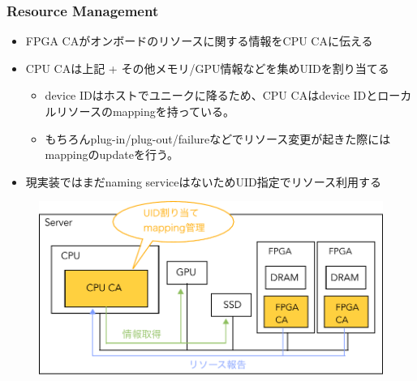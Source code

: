 \documentclass[dvipdfmx,9pt,notheorems]{beamer}
\theoremstyle{definition}
\begin{document}
\begin{frame}\frametitle{Resource Management}
	\begin{itemize}
		\item FPGA CAがオンボードのリソースに関する情報をCPU CAに伝える
		\item CPU CAは上記 + その他メモリ/GPU情報などを集めUIDを割り当てる
			\begin{itemize}
				\item device IDはホストでユニークに降るため、CPU CAはdevice IDとローカルリソースのmappingを持っている。
				\item もちろんplug-in/plug-out/failureなどでリソース変更が起きた際にはmappingのupdateを行う。
			\end{itemize}
		\item 現実装ではまだnaming serviceはないためUID指定でリソース利用する
	\end{itemize}
  \begin{figure}[htb]
		\includegraphics[scale=0.4]{fig/ez_DUA_ControlPlane_ResourceMangement.pdf}
  \end{figure}
\pnote{
}
\end{frame}

\end{document}
